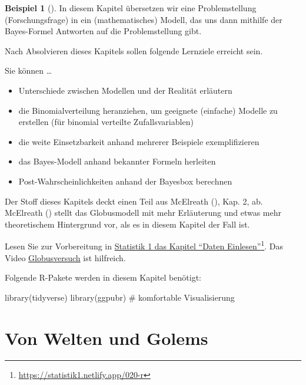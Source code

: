 \documentclass[
  ngerman,
  letterpaper,
  twoside,
  open=any]{scrbook}
\newenvironment{Shaded}{\begin{snugshade}}{\end{snugshade}}
\newcommand{\CommentTok}[1]{\textcolor[rgb]{0.37,0.37,0.37}{#1}}
\newcommand{\FunctionTok}[1]{\textcolor[rgb]{0.28,0.35,0.67}{#1}}
\newcommand{\NormalTok}[1]{\textcolor[rgb]{0.00,0.23,0.31}{#1}}
\providecommand{\tightlist}{%
  \setlength{\itemsep}{0pt}\setlength{\parskip}{0pt}}\usepackage{longtable,booktabs,array}
\theoremstyle{definition}
\newtheorem{example}{Beispiel}[chapter]
\theoremstyle{plain}
\theoremstyle{definition}
\theoremstyle{definition}
\theoremstyle{remark}
\begin{document}
\begin{example}[]
In diesem Kapitel übersetzen wir eine Problemstellung (Forschungsfrage)
in ein (mathematisches) Modell, das uns dann mithilfe der Bayes-Formel
Antworten auf die Problemstellung gibt.

Nach Absolvieren dieses Kapitels sollen folgende Lernziele erreicht
sein.

Sie können \ldots{}

\begin{itemize}
\tightlist
\item
  Unterschiede zwischen Modellen und der Realität erläutern
\item
  die Binomialverteilung heranziehen, um geeignete (einfache) Modelle zu
  erstellen (für binomial verteilte Zufallsvariablen)
\item
  die weite Einsetzbarkeit anhand mehrerer Beispiele exemplifizieren
\item
  das Bayes-Modell anhand bekannter Formeln herleiten
\item
  Post-Wahrscheinlichkeiten anhand der Bayesbox berechnen
\end{itemize}

Der Stoff dieses Kapitels deckt einen Teil aus McElreath
(), Kap. 2, ab. McElreath
() stellt das Globusmodell mit mehr
Erläuterung und etwas mehr theoretischem Hintergrund vor, als es in
diesem Kapitel der Fall ist.

Lesen Sie zur Vorbereitung in
\href{https://statistik1.netlify.app/020-r}{Statistik 1 das Kapitel
\enquote{Daten Einlesen}}\footnote{\url{https://statistik1.netlify.app/020-r}}.
Das Video
\href{https://www.youtube.com/watch?v=fGlt9Ld4xzk&list=PLRR4REmBgpIGgz2Oe2Z9FcoLYBDnaWatN&index=6}{Globusversuch}
ist hilfreich.

Folgende R-Pakete werden in diesem Kapitel benötigt:

\begin{Shaded}
\begin{Highlighting}[]
\FunctionTok{library}\NormalTok{(tidyverse)}
\FunctionTok{library}\NormalTok{(ggpubr)  }\CommentTok{\# komfortable Visualisierung}
\end{Highlighting}
\end{Shaded}

\section{Von Welten und Golems}\label{von-welten-und-golems}


\end{example}
\end{document}
